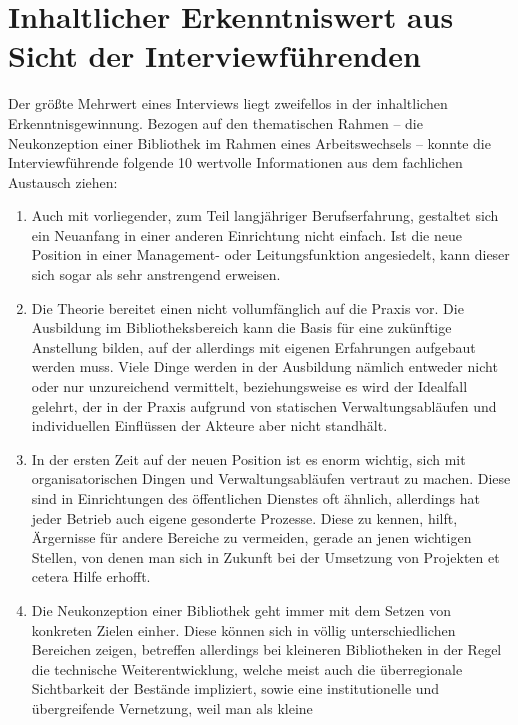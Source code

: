 \documentclass[a4paper,
fontsize=11pt,
oneside,
numbers=noperiodatend,
parskip=half-,
bibliography=totoc,
final
]{scrartcl}
\begin{document}
\section{Inhaltlicher Erkenntniswert aus Sicht der
Interviewführenden}\label{inhaltlicher-erkenntniswert-aus-sicht-der-interviewfuxfchrenden}

Der größte Mehrwert eines Interviews liegt zweifellos in der
inhaltlichen Erkenntnisgewinnung. Bezogen auf den thematischen Rahmen --
die Neukonzeption einer Bibliothek im Rahmen eines Arbeitswechsels --
konnte die Interviewführende folgende 10 wertvolle Informationen aus dem
fachlichen Austausch ziehen:

\begin{enumerate}
\def\labelenumi{\arabic{enumi}.}
\item
  Auch mit vorliegender, zum Teil langjähriger Berufserfahrung,
  gestaltet sich ein Neuanfang in einer anderen Einrichtung nicht
  einfach. Ist die neue Position in einer Management- oder
  Leitungsfunktion angesiedelt, kann dieser sich sogar als sehr
  anstrengend erweisen.
\item
  Die Theorie bereitet einen nicht vollumfänglich auf die Praxis vor.
  Die Ausbildung im Bibliotheksbereich kann die Basis für eine
  zukünftige Anstellung bilden, auf der allerdings mit eigenen
  Erfahrungen aufgebaut werden muss. Viele Dinge werden in der
  Ausbildung nämlich entweder nicht oder nur unzureichend vermittelt,
  beziehungsweise es wird der Idealfall gelehrt, der in der Praxis
  aufgrund von statischen Verwaltungsabläufen und individuellen
  Einflüssen der Akteure aber nicht standhält.
\item
  In der ersten Zeit auf der neuen Position ist es enorm wichtig, sich
  mit organisatorischen Dingen und Verwaltungsabläufen vertraut zu
  machen. Diese sind in Einrichtungen des öffentlichen Dienstes oft
  ähnlich, allerdings hat jeder Betrieb auch eigene gesonderte Prozesse.
  Diese zu kennen, hilft, Ärgernisse für andere Bereiche zu vermeiden,
  gerade an jenen wichtigen Stellen, von denen man sich in Zukunft bei
  der Umsetzung von Projekten et cetera Hilfe erhofft.
\item
  Die Neukonzeption einer Bibliothek geht immer mit dem Setzen von
  konkreten Zielen einher. Diese können sich in völlig unterschiedlichen
  Bereichen zeigen, betreffen allerdings bei kleineren Bibliotheken in
  der Regel die technische Weiterentwicklung, welche meist auch die
  überregionale Sichtbarkeit der Bestände impliziert, sowie eine
  institutionelle und übergreifende Vernetzung, weil man als kleine

\end{enumerate}
\end{document}
